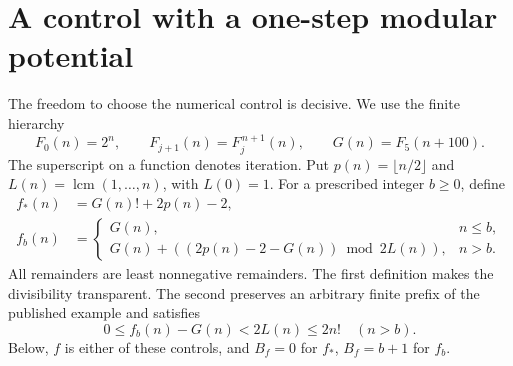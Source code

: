 \section{A control with a one-step modular potential}\label{sec:controls}

The freedom to choose the numerical control is decisive.  We use the
finite hierarchy
\[
 F_0(n)=2^n,\qquad F_{j+1}(n)=F_j^{\,n+1}(n),\qquad
 G(n)=F_5(n+100).
\]
The superscript on a function denotes iteration.  Put
\(p(n)=\lfloor n/2\rfloor\) and
\(L(n)=\operatorname{lcm}(1,\ldots,n)\), with \(L(0)=1\).
For a prescribed integer \(b\ge0\), define
\begin{align}
 f_*(n)&=G(n)!+2p(n)-2,\label{eq:factorial-control}\\
 f_b(n)&=\begin{cases}
 G(n),&n\le b,\\
 G(n)+((2p(n)-2-G(n))\bmod 2L(n)),&n>b.
 \end{cases}\label{eq:near-control}
\end{align}
All remainders are least nonnegative remainders.  The first definition
makes the divisibility transparent.  The second preserves an arbitrary
finite prefix of the published example and satisfies
\begin{equation}\label{eq:control-distance}
 0\le f_b(n)-G(n)<2L(n)\le2n!\quad(n>b).
\end{equation}
Below, \(f\) is either of these controls, and
\(B_f=0\) for \(f_*\), \(B_f=b+1\) for \(f_b\).

